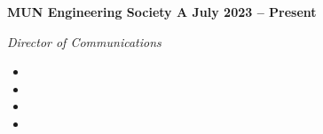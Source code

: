 \vspace{0.1cm}
\textbf{MUN Engineering Society A \hfill July 2023 -- Present} \par
\textit{Director of Communications} \par
\begin{itemize}
	\item
  \item 
  \item 
  \item 
\end{itemize} \par